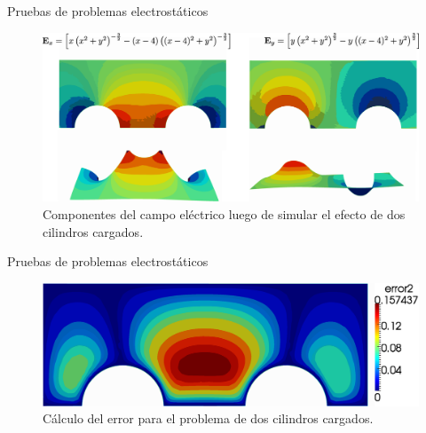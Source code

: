 \documentclass[xcolor=table,serif,handout]{beamer}
\begin{document}
	\begin{frame}{Pruebas de problemas electrostáticos}
		\begin{figure}
		\centering
		\includegraphics[scale=0.18]{two_cylinders.eps}
		\caption{Componentes del campo eléctrico luego de simular el efecto de dos cilindros cargados.}
		\end{figure}
	\end{frame}
	\begin{frame}{Pruebas de problemas electrostáticos}
		\begin{figure}
		\centering
		\includegraphics[scale=0.4]{two_cylinders_error.eps}
		\caption{Cálculo del error para el problema de dos cilindros cargados.}
		\end{figure}
	\end{frame}
\end{document}
